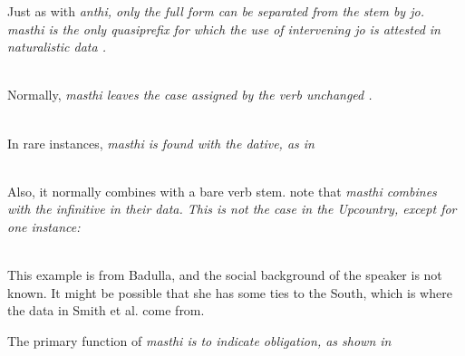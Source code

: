 Just as with \em anthi\em, only the full form can be separated from the stem by \em jo\em. \em masthi \em is the only quasiprefix for which the use of intervening \em jo \em is attested in naturalistic data .

\\ 


Normally, \em masthi \em leaves the case assigned by the verb unchanged .

 \\
In rare instances, \em masthi \em is found with the dative, as in 

 \\

Also, it normally combines with a bare verb stem. \citet{SmithEtAl2004} note that \em masthi \em combines with the infinitive in their data. This is not the case in the Upcountry, except for one instance:

 \\
This example is from Badulla, and the social background of the speaker is not known. It might be possible that she has some ties to the South, which is where  the data in Smith et al. come from.

The primary function of \em masthi \em is to indicate obligation, as shown in 
 
